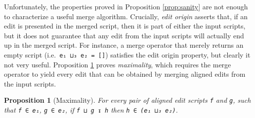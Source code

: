 \documentclass{sigplanconf}
\theoremstyle{plain}
\newtheorem{prop}{Proposition}
\begin{document}

 

Unfortunately, the properties proved in Proposition \ref{prop:sanity}
are not enough to characterize a useful merge algorithm.
%
Crucially, \emph{edit origin} asserts that, if an edit is presented in
the merged script, then it is part of either the input scripts, but it
does not guarantee that any edit from the input scripts will actually
end up in the merged script.
%
For instance, a merge operator that merely returns an empty script
(i.e.\ \texttt{e₁ ⊔₃ e₂ = []}) satisfies the edit origin property, but
clearly it not very useful.
%
Proposition \ref{prop:maximality} proves \emph{maximality}, which
requires the merge operator to yield every edit that can be obtained
by merging aligned edits from the input scripts.

\begin{prop}[Maximality]
  \label{prop:maximality}
  For every pair of aligned edit scripts \texttt{f} and \texttt{g},
  such that \texttt{f ∈ e₁}, \texttt{g ∈ e₂}, if \texttt{f ⊔ g ↧ h}
  then \texttt{h ∈ (e₁ ⊔₃ e₂)}.
\end{prop}
\end{document}
